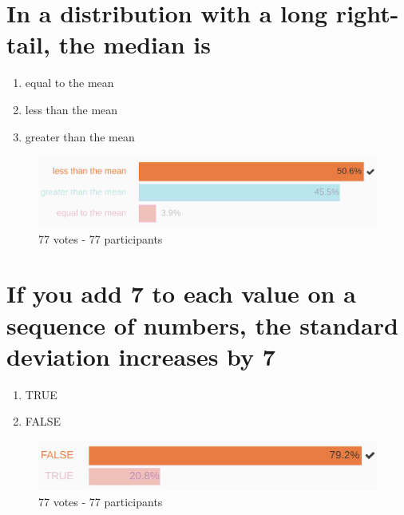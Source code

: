 \documentclass[letterpaper,10pt,twoside,printwatermark=false]{pinp}
\providecommand{\tightlist}{%
  \setlength{\itemsep}{0pt}\setlength{\parskip}{0pt}}
\begin{document}
\newpage

\section{In a distribution with a long right-tail, the median
is}\label{in-a-distribution-with-a-long-right-tail-the-median-is}

\begin{enumerate}
\def\labelenumi{\arabic{enumi}.}
\tightlist
\item
  equal to the mean
\item
  less than the mean
\item
  greater than the mean
\end{enumerate}

\begin{figure}[H]
  \begin{center}
    \includegraphics[scale=0.15]{q4.jpg} 
  \end{center}
  \caption{77 votes - 77 participants}
\end{figure}

\section{If you add 7 to each value on a sequence of numbers, the
standard deviation increases by
7}\label{if-you-add-7-to-each-value-on-a-sequence-of-numbers-the-standard-deviation-increases-by-7}

\begin{enumerate}
\def\labelenumi{\arabic{enumi}.}
\tightlist
\item
  TRUE
\item
  FALSE
\end{enumerate}

\begin{figure}[H]
  \begin{center}
    \includegraphics[scale=0.15]{q5.jpg} 
  \end{center}
  \caption{77 votes - 77 participants}
\end{figure}
\end{document}
